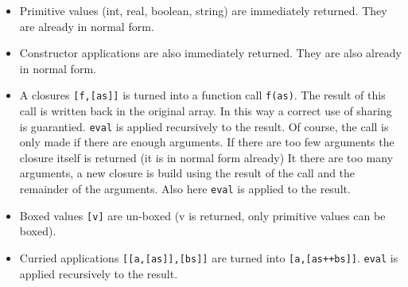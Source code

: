 \begin{itemize}
\item Primitive values (int, real, boolean, string) are immediately returned. They are already in normal form.
\item Constructor applications  are also immediately returned. They are also already in normal form.
\item A closures \texttt{[f,[as]]} is turned into a function call \texttt{f(as)}.
The result of this call is written back in the original array. In this way a correct use of sharing is guarantied.
\texttt{eval} is applied recursively to the result.
Of course, the call is only made if there are enough arguments. 
If there are too few arguments the closure itself is returned (it is in normal form already)
It there are too many arguments, a new closure
is build using the result of the call and the remainder of the arguments.
Also here \texttt{eval} is applied to the result. 
\item Boxed values \texttt{[v]} are un-boxed (v is returned, only primitive values can be boxed).
\item Curried applications \texttt{[[a,[as]],[bs]]} are turned into  \texttt{[a,[as++bs]]}.
\texttt{eval} is applied recursively to the result.
\end{itemize}

